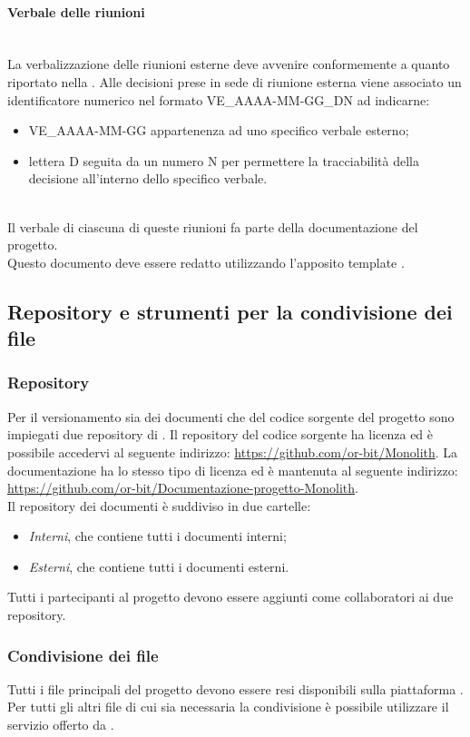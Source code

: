 \paragraph{Verbale delle riunioni}\mbox{}\\
La verbalizzazione delle riunioni esterne deve avvenire conformemente a quanto riportato nella .
Alle decisioni prese in sede di riunione esterna viene associato un identificatore numerico nel formato VE\_AAAA-MM-GG\_DN ad indicarne:
\begin{itemize}
	\item VE\_AAAA-MM-GG appartenenza ad uno specifico verbale esterno;
	\item lettera D seguita da un numero N per permettere la tracciabilità della decisione all'interno dello specifico verbale.
\end{itemize}\\
Il verbale di ciascuna di queste riunioni fa parte della documentazione del progetto.\\
Questo documento deve essere redatto utilizzando l'apposito template \glossario{\LaTeX{}}.

\subsection{Repository e strumenti per la condivisione dei file}

\subsubsection{Repository}
Per il versionamento sia dei documenti che del codice sorgente del progetto sono impiegati due repository di . Il repository del codice sorgente ha licenza  ed è possibile accedervi al seguente indirizzo: \url{https://github.com/or-bit/Monolith}.
La documentazione ha lo stesso tipo di licenza ed è mantenuta al seguente indirizzo: \url{https://github.com/or-bit/Documentazione-progetto-Monolith}.\\
Il repository dei documenti è suddiviso in due cartelle: 
\begin{itemize}
	\item \textit{Interni}, che contiene tutti i documenti interni;
	\item \textit{Esterni}, che contiene tutti i documenti esterni.
\end{itemize}
Tutti i partecipanti al progetto devono essere aggiunti come collaboratori ai due repository.

\subsubsection{Condivisione dei file}
Tutti i file principali del progetto devono essere resi disponibili sulla piattaforma . Per tutti gli altri file di cui sia necessaria la condivisione è possibile utilizzare il servizio offerto da .


